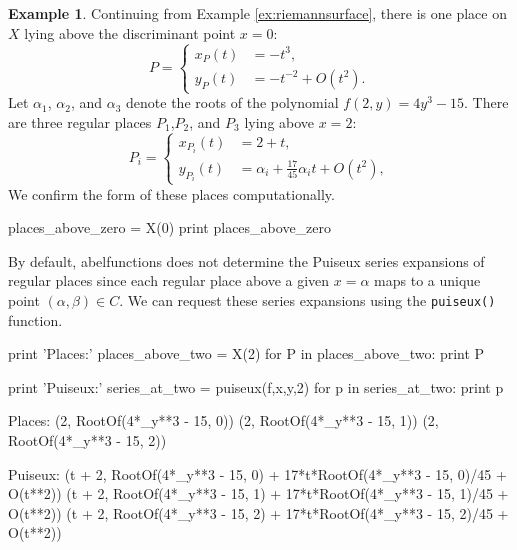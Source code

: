 \documentclass[12pt]{article}
\theoremstyle{definition}
\newtheorem{example}[theorem]{Example}
\begin{document}
\begin{example} \label{ex:places} %
Continuing from Example \ref{ex:riemannsurface}, there is one place on
$X$ lying above the discriminant point $x=0$:
\begin{equation}
  P =
  \begin{cases}
    x_{P}(t) &= -t^3, \\
    y_{P}(t) &= -t^{-2} + O\left( t^2 \right).
  \end{cases}
\end{equation}
Let $\alpha_1$, $\alpha_2$, and $\alpha_3$ denote the roots of the
polynomial $f(2,y) = 4y^3 - 15$. There are three regular places
$P_1$,$P_2$, and $P_3$ lying above $x=2$:
\begin{equation}
  P_i =
  \begin{cases}
    x_{P_i}(t) &= 2 + t, \\
    y_{P_i}(t) &= \alpha_i + \tfrac{17}{45}\alpha_i t + O\left(t^2\right),
  \end{cases}
\end{equation}
We confirm the form of these places computationally.
\begin{ipythoninput}
places_above_zero = X(0)
print places_above_zero
\end{ipythoninput}
\begin{ipythonoutput}
[(-t**3, -1/t**2 + O(t**2))]
\end{ipythonoutput}
By default, {\sc abelfunctions} does not determine the Puiseux series
expansions of regular places since each regular place above a given
$x=\alpha$ maps to a unique point $(\alpha,\beta) \in C$. We can request
these series expansions using the {\tt puiseux()} function.
\begin{ipythoninput}
print 'Places:'
places_above_two = X(2)
for P in places_above_two:
    print P

print 'Puiseux:'
series_at_two = puiseux(f,x,y,2)
for p in series_at_two:
    print p
\end{ipythoninput}
\begin{ipythonoutput}
Places:
(2, RootOf(4*_y**3 - 15, 0))
(2, RootOf(4*_y**3 - 15, 1))
(2, RootOf(4*_y**3 - 15, 2))

Puiseux:
(t + 2, RootOf(4*_y**3 - 15, 0) + 17*t*RootOf(4*_y**3 - 15, 0)/45 + O(t**2))
(t + 2, RootOf(4*_y**3 - 15, 1) + 17*t*RootOf(4*_y**3 - 15, 1)/45 + O(t**2))
(t + 2, RootOf(4*_y**3 - 15, 2) + 17*t*RootOf(4*_y**3 - 15, 2)/45 + O(t**2))
\end{ipythonoutput}

\end{example}
\end{document}
